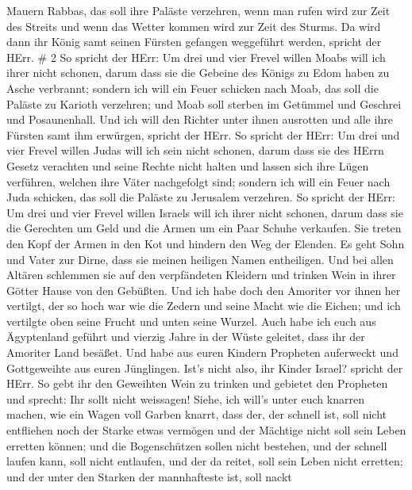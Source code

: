 Mauern Rabbas, das soll ihre Paläste verzehren, wenn man rufen wird zur
Zeit des Streits und wenn das Wetter kommen wird zur Zeit des Sturms.
 Da wird dann ihr König samt seinen Fürsten gefangen
weggeführt werden, spricht der HErr. \# 2  So spricht der
HErr: Um drei und vier Frevel willen Moabs will ich ihrer nicht schonen,
darum dass sie die Gebeine des Königs zu Edom haben zu Asche verbrannt;
 sondern ich will ein Feuer schicken nach Moab, das soll die
Paläste zu Karioth verzehren; und Moab soll sterben im Getümmel und
Geschrei und Posaunenhall.  Und ich will den Richter unter
ihnen ausrotten und alle ihre Fürsten samt ihm erwürgen, spricht der
HErr.  So spricht der HErr: Um drei und vier Frevel willen
Judas will ich sein nicht schonen, darum dass sie des HErrn Gesetz
verachten und seine Rechte nicht halten und lassen sich ihre Lügen
verführen, welchen ihre Väter nachgefolgt sind;  sondern ich
will ein Feuer nach Juda schicken, das soll die Paläste zu Jerusalem
verzehren.  So spricht der HErr: Um drei und vier Frevel
willen Israels will ich ihrer nicht schonen, darum dass sie die
Gerechten um Geld und die Armen um ein Paar Schuhe verkaufen.
 Sie treten den Kopf der Armen in den Kot und hindern den
Weg der Elenden. Es geht Sohn und Vater zur Dirne, dass sie meinen
heiligen Namen entheiligen.  Und bei allen Altären schlemmen
sie auf den verpfändeten Kleidern und trinken Wein in ihrer Götter Hause
von den Gebüßten.  Und ich habe doch den Amoriter vor ihnen
her vertilgt, der so hoch war wie die Zedern und seine Macht wie die
Eichen; und ich vertilgte oben seine Frucht und unten seine Wurzel.
 Auch habe ich euch aus Ägyptenland geführt und vierzig
Jahre in der Wüste geleitet, dass ihr der Amoriter Land besäßet.
 Und habe aus euren Kindern Propheten auferweckt und
Gottgeweihte aus euren Jünglingen. Ist's nicht also, ihr Kinder Israel?
spricht der HErr.  So gebt ihr den Geweihten Wein zu
trinken und gebietet den Propheten und sprecht: Ihr sollt nicht
weissagen!  Siehe, ich will's unter euch knarren machen,
wie ein Wagen voll Garben knarrt,  dass der, der schnell
ist, soll nicht entfliehen noch der Starke etwas vermögen und der
Mächtige nicht soll sein Leben erretten können;  und die
Bogenschützen sollen nicht bestehen, und der schnell laufen kann, soll
nicht entlaufen, und der da reitet, soll sein Leben nicht erretten;
 und der unter den Starken der mannhafteste ist, soll nackt
